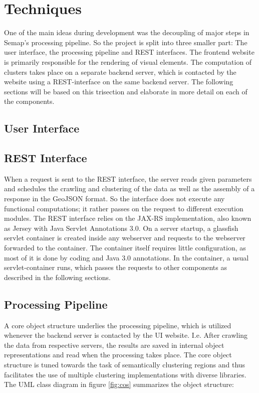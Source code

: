 \section{Techniques}
One of the main ideas during development was the decoupling of major steps in Semap’s processing pipeline. So the project is split into three smaller part: The user interface, the processing pipeline and REST interfaces. 
The frontend website is primarily responsible for the rendering of visual elements. The computation of clusters takes place on a separate backend server, which is contacted by the website using a REST-interface on the same backend server. The following sections will be based on this trisection and elaborate in more detail on each of the components.

\subsection{User Interface}


\subsection{REST Interface}
When a request is sent to the REST interface, the server reads given parameters and schedules the crawling and clustering of the data as well as the assembly of a response in the GeoJSON format. So the interface does not execute any functional computations; it rather passes on the request to different execution modules. The REST interface relies on the JAX-RS implementation, also known as Jersey with Java Servlet Annotations 3.0. On a server startup, a glassfish servlet container is created inside any webserver and requests to the webserver forwarded to the container. The container itself requires little configuration, as most of it is done by coding and Java 3.0 annotations. In the container, a usual servlet-container runs, which passes the requests to other components as described in the following sections. 

\subsection{Processing Pipeline}
A core object structure underlies the processing pipeline, which is utilized whenever the backend server is contacted by the UI website. I.e. After crawling the data from respective servers, the results are saved in internal object representations and read when the processing takes place. The core object structure is tuned towards the task of semantically clustering regions and thus facilitates the use of multiple clustering implementations with diverse libraries. The UML class diagram in figure \ref{fig:cos} summarizes the object structure:
 
